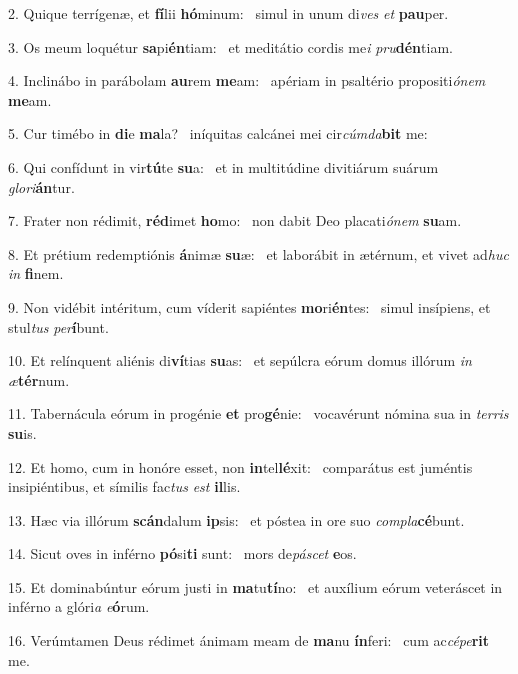 2. Quique terrígenæ, et \textbf{fí}lii \textbf{hó}minum: \ast\  simul in unum di\textit{ves} \textit{et} \textbf{pau}per.\

3. Os meum loquétur \textbf{sa}pi\textbf{én}tiam: \ast\  et meditátio cordis me\textit{i} \textit{pru}\textbf{dén}tiam.\

4. Inclinábo in parábolam \textbf{au}rem \textbf{me}am: \ast\  apériam in psaltério propositi\textit{ó}\textit{nem} \textbf{me}am.\

5. Cur timébo in \textbf{di}e \textbf{ma}la? \ast\  iníquitas calcánei mei cir\textit{cúm}\textit{da}\textbf{bit} me:\

6. Qui confídunt in vir\textbf{tú}te \textbf{su}a: \ast\  et in multitúdine divitiárum suárum \textit{glo}\textit{ri}\textbf{án}tur.\

7. Frater non rédimit, \textbf{réd}imet \textbf{ho}mo: \ast\  non dabit Deo placati\textit{ó}\textit{nem} \textbf{su}am.\

8. Et prétium redemptiónis \textbf{á}nimæ \textbf{su}æ: \ast\  et laborábit in ætérnum, et vivet ad\textit{huc} \textit{in} \textbf{fi}nem.\

9. Non vidébit intéritum, cum víderit sapiéntes \textbf{mo}ri\textbf{én}tes: \ast\  simul insípiens, et stul\textit{tus} \textit{per}\textbf{í}bunt.\

10. Et relínquent aliénis di\textbf{ví}tias \textbf{su}as: \ast\  et sepúlcra eórum domus illórum \textit{in} \textit{æ}\textbf{tér}num.\

11. Tabernácula eórum in progénie \textbf{et} pro\textbf{gé}nie: \ast\  vocavérunt nómina sua in \textit{ter}\textit{ris} \textbf{su}is.\

12. Et homo, cum in honóre esset, non \textbf{in}tel\textbf{lé}xit: \ast\  comparátus est juméntis insipiéntibus, et símilis fac\textit{tus} \textit{est} \textbf{il}lis.\

13. Hæc via illórum \textbf{scán}dalum \textbf{ip}sis: \ast\  et póstea in ore suo \textit{com}\textit{pla}\textbf{cé}bunt.\

14. Sicut oves in inférno \textbf{pó}si\textbf{ti} sunt: \ast\  mors de\textit{pá}\textit{scet} \textbf{e}os.\

15. Et dominabúntur eórum justi in \textbf{ma}tu\textbf{tí}no: \ast\  et auxílium eórum veteráscet in inférno a glóri\textit{a} \textit{e}\textbf{ó}rum.\

16. Verúmtamen Deus rédimet ánimam meam de \textbf{ma}nu \textbf{ín}feri: \ast\  cum ac\textit{cé}\textit{pe}\textbf{rit} me.\

